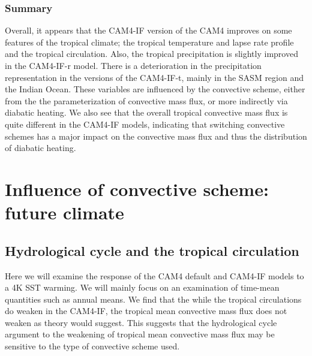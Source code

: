 \documentclass[letterpaper,12pt,titlepage,oneside,final]{book}
\begin{document}
\subsection{Summary}

Overall, it appears that the CAM4-IF version of the CAM4 improves on some features of the tropical climate; the tropical temperature and lapse rate profile and the tropical circulation. Also, the tropical precipitation is slightly improved in the CAM4-IF-r model. There is a deterioration in the precipitation representation in the versions of the CAM4-IF-t, mainly in the SASM region and the Indian Ocean. These variables are influenced by the convective scheme, either from the the parameterization of convective mass flux, or more indirectly via diabatic heating. We also see that the overall tropical convective mass flux is quite different in the CAM4-IF models, indicating that switching convective schemes has a major impact on the convective mass flux and thus the distribution of diabatic heating.


\chapter{Influence of convective scheme: future climate}

\section{Hydrological cycle and the tropical circulation}

Here we will examine the response of the CAM4 default and CAM4-IF models to a 4K SST warming. We will mainly focus on an examination of time-mean quantities such as annual means. We find that the while the tropical circulations do weaken in the CAM4-IF, the tropical mean convective mass flux does not weaken as theory would suggest. This suggests that the hydrological cycle argument to the weakening of tropical mean convective mass flux may be sensitive to the type of convective scheme used.
\end{document}
